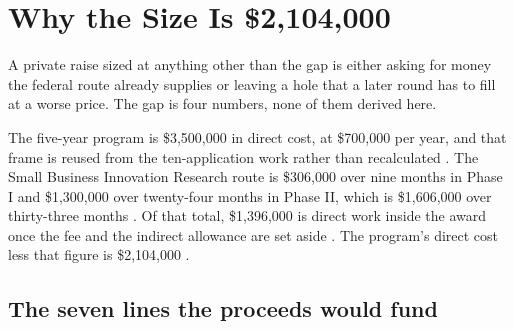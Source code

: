 \section{Why the Size Is \$2,104,000}

A private raise sized at anything other than the gap is either asking for money
the federal route already supplies or leaving a hole that a later round has to
fill at a worse price. The gap is four numbers, none of them derived here.

The five-year program is \$3,500,000 in direct cost, at \$700,000 per year, and
that frame is reused from the ten-application work rather than recalculated
\cite{tenapps2026}. The Small Business Innovation Research route is \$306,000
over nine months in Phase I and \$1,300,000 over twenty-four months in Phase II,
which is \$1,606,000 over thirty-three months \cite{nihsbirseed,sbapolicydirective}.
Of that total, \$1,396,000 is direct work inside the award once the fee and the
indirect allowance are set aside \cite{ecfr2026uniformguidance,nihgpsfee}. The
program's direct cost less that figure is \$2,104,000 \cite{capitalplan2026}.

\subsection{The seven lines the proceeds would fund}


